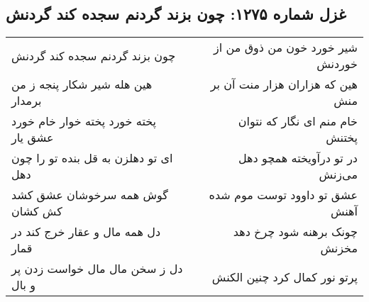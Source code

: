\begin{center}
\section*{غزل شماره ۱۲۷۵: چون بزند گردنم سجده کند گردنش}
\label{sec:1275}
\begin{longtable}{l p{0.5cm} r}
چون بزند گردنم سجده کند گردنش
&&
شیر خورد خون من ذوق من از خوردنش
\\
هین هله شیر شکار پنجه ز من برمدار
&&
هین که هزاران هزار منت آن بر منش
\\
پخته خورد پخته خوار خام خورد عشق یار
&&
خام منم ای نگار که نتوان پختنش
\\
ای تو دهلزن به قل بنده تو را چون دهل
&&
در تو درآویخته همچو دهل می‌زنش
\\
گوش همه سرخوشان عشق کشد کش کشان
&&
عشق تو داوود توست موم شده آهنش
\\
دل همه مال و عقار خرج کند در قمار
&&
چونک برهنه شود چرخ دهد مخزنش
\\
دل ز سخن مال مال خواست زدن پر و بال
&&
پرتو نور کمال کرد چنین الکنش
\\
\end{longtable}
\end{center}
